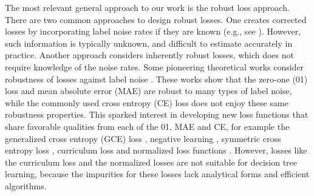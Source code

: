 \documentclass[letterpaper]{article} %
\begin{document}
The most relevant general approach to our work is the robust loss approach.
There are two common approaches to design robust losses.
One creates corrected losses by incorporating label noise rates if they are known
(e.g., see \cite{natarajan2013learning,patrini2017making}).
However, such information is typically unknown, and difficult to estimate accurately in practice.
Another approach considers inherently robust losses, which does not require
knowledge of the noise rates.
Some pioneering theoretical works consider robustness of losses against label noise
\cite{manwani2013noise, ghosh2015making, ghosh2017robust}.
These works show that the zero-one (01) loss and mean absolute error (MAE) are
robust to many types of label noise, while the commonly used cross entropy (CE)
loss does not enjoy these same robustness properties.
This sparked interest in developing new loss functions that share favorable qualities from each of the 01, MAE and CE, for example the
generalized cross entropy (GCE) loss \cite{zhang2018generalized},
negative learning \cite{kim2019nlnl},
symmetric cross entropy loss \cite{wang2019symmetric},
curriculum loss \cite{Lyu2020Curriculum} and
normalized loss functions \cite{ma2020normalized}.
However, losses like the curriculum loss and the normalized losses are not
suitable for decision tree learning, because the impurities for these losses lack
analytical forms and efficient algorithms.


\end{document}
